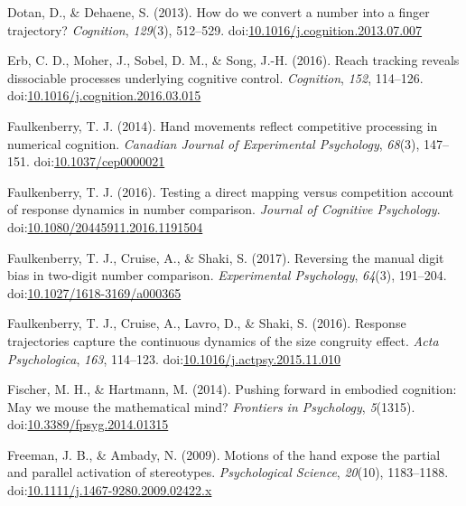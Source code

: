 \documentclass[english,man]{apa6}
\theoremstyle{definition}
\theoremstyle{definition}
\theoremstyle{definition}
\theoremstyle{remark}
\begin{document}
\hypertarget{ref-dotan2013}{}
Dotan, D., \& Dehaene, S. (2013). How do we convert a number into a
finger trajectory? \emph{Cognition}, \emph{129}(3), 512--529.
doi:\href{https://doi.org/10.1016/j.cognition.2013.07.007}{10.1016/j.cognition.2013.07.007}

\hypertarget{ref-erb2016}{}
Erb, C. D., Moher, J., Sobel, D. M., \& Song, J.-H. (2016). Reach
tracking reveals dissociable processes underlying cognitive control.
\emph{Cognition}, \emph{152}, 114--126.
doi:\href{https://doi.org/10.1016/j.cognition.2016.03.015}{10.1016/j.cognition.2016.03.015}

\hypertarget{ref-faulkenberry2014}{}
Faulkenberry, T. J. (2014). Hand movements reflect competitive
processing in numerical cognition. \emph{Canadian Journal of
Experimental Psychology}, \emph{68}(3), 147--151.
doi:\href{https://doi.org/10.1037/cep0000021}{10.1037/cep0000021}

\hypertarget{ref-faulkenberry2016}{}
Faulkenberry, T. J. (2016). Testing a direct mapping versus competition
account of response dynamics in number comparison. \emph{Journal of
Cognitive Psychology}.
doi:\href{https://doi.org/10.1080/20445911.2016.1191504}{10.1080/20445911.2016.1191504}

\hypertarget{ref-faulkenberry2017}{}
Faulkenberry, T. J., Cruise, A., \& Shaki, S. (2017). Reversing the
manual digit bias in two-digit number comparison. \emph{Experimental
Psychology}, \emph{64}(3), 191--204.
doi:\href{https://doi.org/10.1027/1618-3169/a000365}{10.1027/1618-3169/a000365}

\hypertarget{ref-faulkenberryShaki2016}{}
Faulkenberry, T. J., Cruise, A., Lavro, D., \& Shaki, S. (2016).
Response trajectories capture the continuous dynamics of the size
congruity effect. \emph{Acta Psychologica}, \emph{163}, 114--123.
doi:\href{https://doi.org/10.1016/j.actpsy.2015.11.010}{10.1016/j.actpsy.2015.11.010}

\hypertarget{ref-fischerHartmann2014}{}
Fischer, M. H., \& Hartmann, M. (2014). Pushing forward in embodied
cognition: May we mouse the mathematical mind? \emph{Frontiers in
Psychology}, \emph{5}(1315).
doi:\href{https://doi.org/10.3389/fpsyg.2014.01315}{10.3389/fpsyg.2014.01315}

\hypertarget{ref-freeman2009motions}{}
Freeman, J. B., \& Ambady, N. (2009). Motions of the hand expose the
partial and parallel activation of stereotypes. \emph{Psychological
Science}, \emph{20}(10), 1183--1188.
doi:\href{https://doi.org/10.1111/j.1467-9280.2009.02422.x}{10.1111/j.1467-9280.2009.02422.x}
\end{document}

